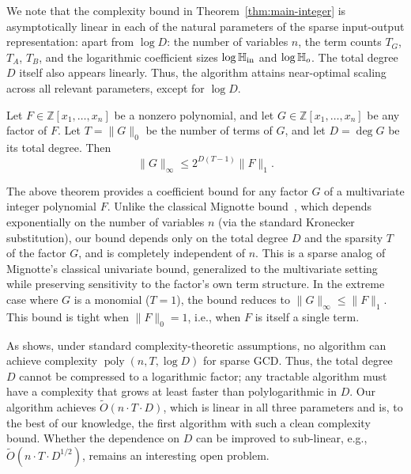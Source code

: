 \documentclass{article}
\numberwithin{equation}{section}
\begin{document}
We note that the complexity bound in Theorem~\ref{thm:main-integer} is asymptotically linear in each of the natural parameters of the sparse input-output representation:  apart from $\log D$: the number of variables $n$, the term counts $T_G$, $T_A$, $T_B$, and the logarithmic coefficient sizes $\log \mathbb{H}_{\rm in}$ and $\log \mathbb{H}_{o}$. The total degree $D$ itself also appears linearly. 
Thus, the algorithm attains near-optimal scaling across all relevant parameters, except for $\log D$.


\begin{theorem}
Let $F \in \mathbb{Z}[x_1, \dots, x_n]$ be a nonzero polynomial, and let $G \in \mathbb{Z}[x_1, \dots, x_n]$ be any factor of $F$. Let $T = \|G\|_0$ be the number of terms of $G$, and let $D = \deg G$ be its total degree. Then
\[
\|G\|_\infty \le 2^{D(T-1)} \|F\|_1.
\]
\end{theorem}
%
The above theorem provides a coefficient bound for any factor $G$ of a multivariate integer polynomial $F$. 
Unlike the classical Mignotte bound~\cite{mignotte1974inequality}, which depends exponentially on the number of variables $n$ (via the standard Kronecker substitution), our bound depends only on the total degree $D$ and the sparsity $T$ of the factor $G$, and is completely independent of $n$. 
This is a sparse analog of Mignotte's classical univariate bound, generalized to the multivariate setting while preserving sensitivity to the factor's own term structure.
%
In the extreme case where $G$ is a monomial ($T = 1$), the bound reduces to $\|G\|_\infty \le \|F\|_1$. This bound is tight when $\|F\|_0 = 1$, i.e., when $F$ is itself a single term.




As \cite{Qiu2026OutputSensitive} shows, under standard complexity-theoretic assumptions, no algorithm can achieve complexity $\operatorname{poly}(n, T, \log D)$ for sparse GCD. Thus, the total degree $D$ cannot be compressed to a logarithmic factor; any tractable algorithm must have a complexity that grows at least faster than polylogarithmic in $D$. Our algorithm achieves $\widetilde{O}(n \cdot T \cdot D)$, which is linear in all three parameters and is, to the best of our knowledge, the first algorithm with such a clean complexity bound. Whether the dependence on $D$ can be improved to sub-linear, e.g., $\widetilde{O}(n \cdot T \cdot D^{1/2})$, remains an interesting open problem.
\end{document}
